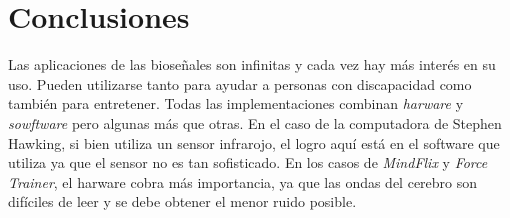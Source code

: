 \section{Conclusiones}

Las aplicaciones de las bioseñales son infinitas y cada vez hay más interés en su uso. Pueden utilizarse tanto para ayudar a personas con discapacidad como también para entretener. Todas las implementaciones combinan \emph{harware} y \emph{sowftware} pero algunas más que otras. En el caso de la computadora de Stephen Hawking, si bien utiliza un sensor infrarojo, el logro aquí está en el software que utiliza ya que el sensor no es tan sofisticado. En los casos de \emph{MindFlix} y \emph{Force Trainer}, el harware cobra más importancia, ya que las ondas del cerebro son difíciles de leer y se debe obtener el menor ruido posible.